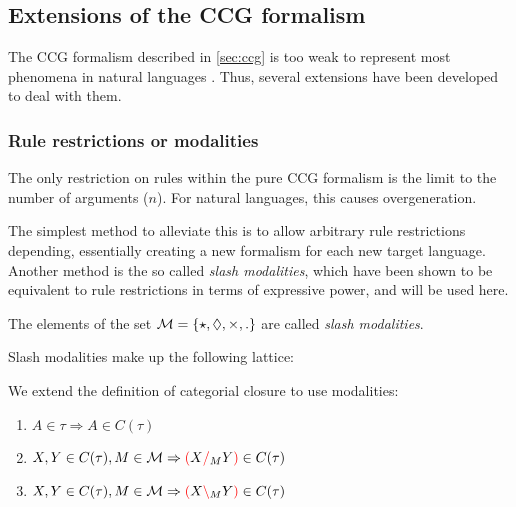 \documentclass[main.tex]{subfiles}
\begin{document}
\subsection{ Extensions of the CCG formalism}

The CCG formalism described in \ref{sec:ccg} is too weak to represent most
phenomena in natural languages \cite{steedman}. Thus, several extensions have
been developed to deal with them.

\subsubsection{Rule restrictions or modalities}
The only restriction on rules within the pure CCG formalism is the limit to
the number of arguments ($n$). For natural languages, this causes overgeneration.

The simplest method to alleviate this is to allow arbitrary rule restrictions
depending, essentially creating a new formalism for each new target language.
Another method is the so called \emph{slash modalities}, which have been shown
\cite{modal}
to be equivalent to rule restrictions in terms of expressive power, and will
be used here.

\begin{defn}
    The elements of the set
    $\mathcal{M} = \{ \star, \lozenge, \times, . \}$ are called
    \emph{slash modalities}.

    Slash modalities make up the following lattice:

    \begin{center}
    \end{center}
\end{defn}

\begin{defn}
    We extend the definition of categorial closure to use modalities:
    \begin{enumerate}
        \item \label{cmod:atomic} $A \in \tau \Rightarrow A \in C(\tau)$
        \item \label{cmod:right}  $X, Y \in C(\tau), M \in \mathcal{M} \Rightarrow \textcolor{red}{(} X \textcolor{red}{/}_M Y \textcolor{red}{)} \in C(\tau)$
        \item \label{cmod:left}   $X, Y \in C(\tau), M \in \mathcal{M} \Rightarrow \textcolor{red}{(} X \textcolor{red}{\backslash}_M Y \textcolor{red}{)} \in C(\tau)$
    \end{enumerate}
\end{defn}
\end{document}
